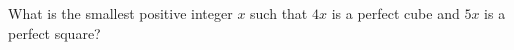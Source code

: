 What is the smallest positive integer $x$ such that $4x$ is a perfect cube and $5x$ is a perfect square?
